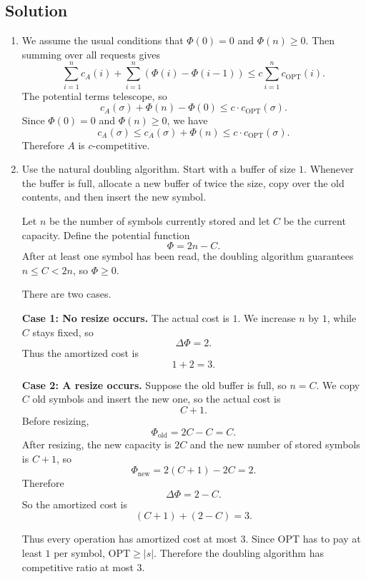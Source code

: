 \documentclass[14pt]{extreport}
\begin{document}
\subsection*{Solution}
    \begin{enumerate}[label=(\alph*)]
        \item We assume the usual conditions that $\Phi(0) = 0$ and $\Phi(n) \ge 0$. Then summing over all requests gives
        $$
        \sum_{i = 1}^{n} c_A(i) + \sum_{i = 1}^{n} \left(\Phi(i) - \Phi(i - 1)\right) \le c \sum_{i = 1}^{n} c_{\text{OPT}}(i).
        $$
        The potential terms telescope, so
        $$
        c_A(\sigma) + \Phi(n) - \Phi(0) \le c \cdot c_{\text{OPT}}(\sigma).
        $$
        Since $\Phi(0) = 0$ and $\Phi(n) \ge 0$, we have
        $$
        c_A(\sigma) \le c_A(\sigma) + \Phi(n) \le c \cdot c_{\text{OPT}}(\sigma).
        $$
        Therefore $A$ is $c$-competitive.

        \item Use the natural doubling algorithm. Start with a buffer of size $1$. Whenever the buffer is full, allocate a new buffer of twice the size, copy over the old contents, and then insert the new symbol.

        \vspace{5mm}
        Let $n$ be the number of symbols currently stored and let $C$ be the current capacity. Define the potential function
        $$
        \Phi = 2n - C.
        $$
        After at least one symbol has been read, the doubling algorithm guarantees $n \le C < 2n$, so $\Phi \ge 0$.

        \vspace{5mm}
        There are two cases.

        \vspace{5mm}
        \textbf{Case 1: No resize occurs.} The actual cost is $1$. We increase $n$ by $1$, while $C$ stays fixed, so
        $$
        \Delta \Phi = 2.
        $$
        Thus the amortized cost is
        $$
        1 + 2 = 3.
        $$

        \textbf{Case 2: A resize occurs.} Suppose the old buffer is full, so $n = C$. We copy $C$ old symbols and insert the new one, so the actual cost is
        $$
        C + 1.
        $$
        Before resizing,
        $$
        \Phi_{\text{old}} = 2C - C = C.
        $$
        After resizing, the new capacity is $2C$ and the new number of stored symbols is $C + 1$, so
        $$
        \Phi_{\text{new}} = 2(C + 1) - 2C = 2.
        $$
        Therefore
        $$
        \Delta \Phi = 2 - C.
        $$
        So the amortized cost is
        $$
        (C + 1) + (2 - C) = 3.
        $$

        Thus every operation has amortized cost at most $3$. Since OPT has to pay at least $1$ per symbol, $\text{OPT} \ge |s|$. Therefore the doubling algorithm has competitive ratio at most $3$.
    \end{enumerate}
\end{document}
